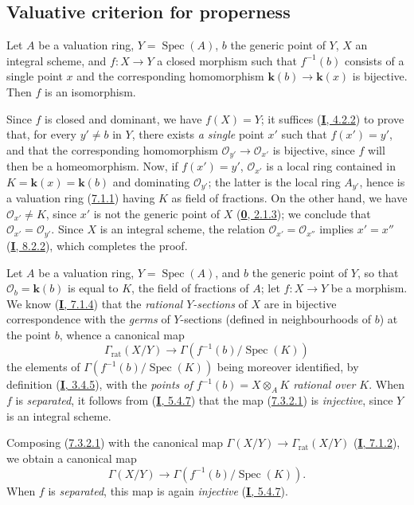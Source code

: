 \subsection{Valuative criterion for properness}
\label{subsection:II.7.3}

\begin{proposition}[7.3.1]
\label{II.7.3.1}
Let $A$ be a valuation ring, $Y=\operatorname{Spec}(A)$, $b$ the generic
point of $Y$, $X$ an integral \textup{scheme}, and $f:X\to Y$ a \textup{closed} morphism such
that $f^{-1}(b)$ consists of a single point $x$ and the corresponding
homomorphism $\boldsymbol{k}(b)\to \boldsymbol{k}(x)$ is bijective. Then $f$ is an isomorphism.
\end{proposition}

Since $f$ is closed and dominant, we have $f(X)=Y$; it suffices
(\hyperref[I.4.2.2]{\textbf{I}, 4.2.2}) to prove that, for every $y'\neq b$ in $Y$,
there exists \emph{a single} point $x'$ such that $f(x')=y'$, and that the
corresponding homomorphism $\mathcal{O}_{y'}\to\mathcal{O}_{x'}$ is bijective,
since $f$ will then be a homeomorphism. Now, if $f(x')=y'$, $\mathcal{O}_{x'}$
is a local ring contained in $K=\boldsymbol{k}(x)=\boldsymbol{k}(b)$ and dominating $\mathcal{O}_{y'}$;
the latter is the local ring $A_{y'}$, hence is a valuation ring
(\hyperref[II.7.1.1]{7.1.1}) having $K$ as field of fractions. On the
other hand, we have $\mathcal{O}_{x'}\neq K$, since $x'$ is not the generic
point of $X$ (\hyperref[0.2.1.3]{\textbf{0}, 2.1.3}); we conclude that
$\mathcal{O}_{x'}=\mathcal{O}_{y'}$. Since $X$ is an integral scheme, the
relation $\mathcal{O}_{x'}=\mathcal{O}_{x''}$ implies $x'=x''$
(\hyperref[I.8.2.2]{\textbf{I}, 8.2.2}), which completes the proof.

\begin{env}[7.3.2]
\label{II.7.3.2}
Let $A$ be a valuation ring, $Y=\operatorname{Spec}(A)$, and $b$ the generic
point of $Y$, so that $\mathcal{O}_b=\boldsymbol{k}(b)$ is equal to $K$, the field of
fractions of $A$; let $f:X\to Y$ be a morphism. We know
(\hyperref[I.7.1.4]{\textbf{I}, 7.1.4}) that the \emph{rational $Y$-sections} of
$X$ are in bijective correspondence with the \emph{germs} of $Y$-sections
(defined in neighbourhoods of $b$) at the point $b$, whence a canonical
map
\[
\tag{7.3.2.1}
\label{II.7.3.2.1}
\Gamma_{\mathrm{rat}}(X/Y)\longrightarrow
\Gamma(f^{-1}(b)/\operatorname{Spec}(K))
\]
the elements of $\Gamma(f^{-1}(b)/\operatorname{Spec}(K))$ being moreover
identified, by definition (\hyperref[I.3.4.5]{\textbf{I}, 3.4.5}), with the
\emph{points of $f^{-1}(b)=X\otimes_AK$ rational over $K$}. When $f$ is
\emph{separated}, it follows from (\hyperref[I.5.4.7]{\textbf{I}, 5.4.7}) that the
map (\hyperref[II.7.3.2.1]{7.3.2.1}) is \emph{injective}, since $Y$ is
an integral scheme.

Composing (\hyperref[II.7.3.2.1]{7.3.2.1}) with the canonical map
$\Gamma(X/Y)\to\Gamma_{\mathrm{rat}}(X/Y)$
(\hyperref[I.7.1.2]{\textbf{I}, 7.1.2}), we obtain a canonical map
\[
\tag{7.3.2.2}
\label{II.7.3.2.2}
\Gamma(X/Y)\longrightarrow \Gamma(f^{-1}(b)/\operatorname{Spec}(K)).
\]
When $f$ is \emph{separated}, this map is again \emph{injective}
(\hyperref[I.5.4.7]{\textbf{I}, 5.4.7}).
\end{env}

